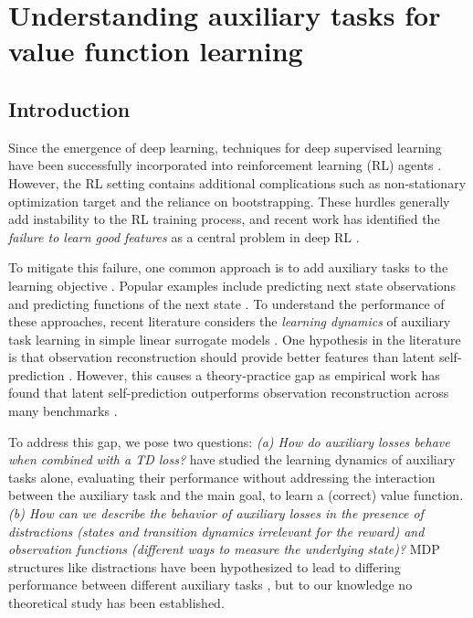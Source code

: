 \chapter{Understanding auxiliary tasks for value function learning}
\label{chap:understanding}

\section{Introduction}

Since the emergence of deep learning, techniques for deep supervised learning have been successfully incorporated into reinforcement learning (RL) agents \parencite{dqn,ddpg}.
However, the RL setting contains additional complications such as non-stationary optimization target and the reliance on bootstrapping.
These hurdles generally add instability to the RL training process, and recent work has identified the \emph{failure to learn good features} as a central problem in deep RL \parencite{lyle2022understanding,nikishin2022primacy,kumar2021implicit}.

To mitigate this failure, one common approach is to add auxiliary tasks to the learning objective \parencite{jaderberg2017reinforcement}. 
Popular examples include predicting next state observations \parencite{jaderberg2016reinforcement} and predicting functions of the next state \parencite{schwarzer2021dataefficient,ni2024bridging}.
To understand the performance of these approaches, recent literature \parencite{tang2022understanding,lelan2023bootstrapped} considers the \emph{learning dynamics} of auxiliary task learning in simple linear surrogate models \parencite{saxe2014exact}.
One hypothesis in the literature is that observation reconstruction should provide better features than latent self-prediction \parencite{behzadian2019fast,tang2022understanding}. 
However, this causes a theory-practice gap as empirical work has found that latent self-prediction outperforms observation reconstruction across many benchmarks \parencite{schwarzer2021dataefficient,ni2024bridging}.

To address this gap, we pose two questions: \emph{(a) How do auxiliary losses behave when combined with a TD loss?} \textcite{tang2022understanding,lelan2022generalization,tang2023towards} have studied the learning dynamics of auxiliary tasks alone, evaluating their performance without addressing the interaction between the auxiliary task and the main goal, to learn a (correct) value function. \emph{(b) How can we describe the behavior of auxiliary losses in the presence of distractions (states and transition dynamics irrelevant for the reward) and observation functions (different ways to measure the underlying state)?} MDP structures like distractions have been hypothesized to lead to differing performance between different auxiliary tasks \parencite{ni2024bridging}, but to our knowledge no theoretical study has been established.


